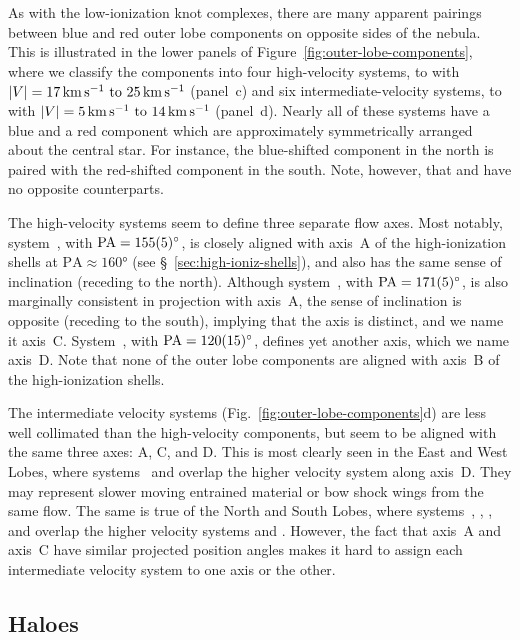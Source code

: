 \documentclass[useAMS, usenatbib]{mnras}
\begin{document}
As with the low-ionization knot complexes,
there are many apparent pairings between blue and red outer lobe components on opposite sides of the nebula.
This is illustrated in the lower panels of Figure~\ref{fig:outer-lobe-components},
where we classify the components into four high-velocity systems,
 to 
with \(|V| = \text{\SIrange{17}{25}{km.s^{-1}}}\) (panel~c)
and six intermediate-velocity systems,
 to 
with \(|V| = \text{\SIrange{5}{14}{km.s^{-1}}}\) (panel~d).
Nearly all of these systems have a blue and a red component
which are approximately symmetrically arranged about the central star.
For instance, the blue-shifted  component in the north
is paired with the red-shifted  component in the south.
Note, however, that  and  have no opposite counterparts.

The high-velocity systems seem to define three separate flow axes.
Most notably, system~, with \(\text{PA} = \ang{155 \pm 5}\),
is closely aligned with axis~A of the high-ionization shells at \(\text{PA} \approx \ang{160}\)
(see \S~\ref{sec:high-ioniz-shells}),
and also has the same sense of inclination (receding to the north).
Although system~, with  \(\text{PA} = \ang{171 \pm 5}\),
is also marginally consistent in projection with axis~A,
the sense of inclination is opposite (receding to the south),
implying that the axis is distinct,
and we name it axis~C.
System~, with  \(\text{PA} = \ang{120 \pm 15}\), defines yet another axis,
which we name axis~D.
Note that none of the outer lobe components are aligned with axis~B of the high-ionization shells.

The intermediate velocity systems (Fig.~\ref{fig:outer-lobe-components}d)
are less well collimated than the high-velocity components,
but seem to be aligned with the same three axes: A, C, and D.
This is most clearly seen in the East and West Lobes,
where systems~ and  overlap the higher velocity system  along axis~D.
They may represent slower moving entrained material or bow shock wings from the same flow.
The same is true of the North and South Lobes,
where systems~, , , and 
overlap the higher velocity systems  and .
However, the fact that axis~A and axis~C have similar projected position angles
makes it hard to assign each intermediate velocity system to one axis or the other.


\subsection{Haloes}
\label{sec:haloes}
\end{document}
